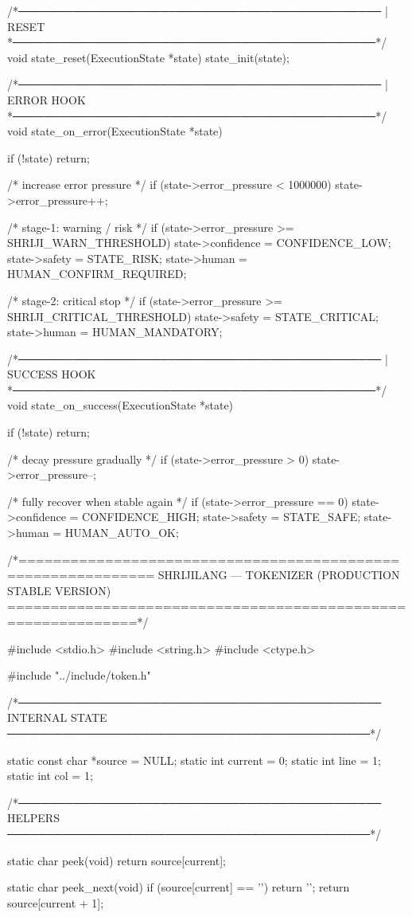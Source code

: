 \documentclass{article}
\begin{document}
/*──────────────────────────────────────────────
 | RESET
 *──────────────────────────────────────────────*/
void state_reset(ExecutionState *state)
{
    state_init(state);
}

/*──────────────────────────────────────────────
 | ERROR HOOK
 *──────────────────────────────────────────────*/
void state_on_error(ExecutionState *state)
{
    if (!state) return;

    /* increase error pressure */
    if (state->error_pressure < 1000000)
        state->error_pressure++;

    /* stage-1: warning / risk */
    if (state->error_pressure >= SHRIJI_WARN_THRESHOLD) {
        state->confidence = CONFIDENCE_LOW;
        state->safety = STATE_RISK;
        state->human = HUMAN_CONFIRM_REQUIRED;
    }

    /* stage-2: critical stop */
    if (state->error_pressure >= SHRIJI_CRITICAL_THRESHOLD) {
        state->safety = STATE_CRITICAL;
        state->human = HUMAN_MANDATORY;
    }
}

/*──────────────────────────────────────────────
 | SUCCESS HOOK
 *──────────────────────────────────────────────*/
void state_on_success(ExecutionState *state)
{
    if (!state) return;

    /* decay pressure gradually */
    if (state->error_pressure > 0)
        state->error_pressure--;

    /* fully recover when stable again */
    if (state->error_pressure == 0) {
        state->confidence = CONFIDENCE_HIGH;
        state->safety = STATE_SAFE;
        state->human = HUMAN_AUTO_OK;
    }
}
/*=============================================================
  SHRIJILANG — TOKENIZER (PRODUCTION STABLE VERSION)
=============================================================*/

#include <stdio.h>
#include <string.h>
#include <ctype.h>

#include "../include/token.h"

/*──────────────────────────────────────────────
  INTERNAL STATE
──────────────────────────────────────────────*/

static const char *source = NULL;
static int current = 0;
static int line = 1;
static int col  = 1;

/*──────────────────────────────────────────────
  HELPERS
──────────────────────────────────────────────*/

static char peek(void)
{
    return source[current];
}

static char peek_next(void)
{
    if (source[current] == '\0') return '\0';
    return source[current + 1];
}
\end{document}
